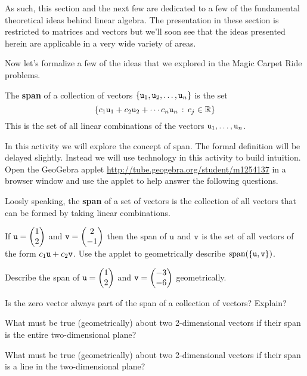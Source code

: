 As such, this section and the next few are dedicated to a few of the fundamental theoretical ideas behind
linear algebra.  The presentation in these section is restricted to matrices and vectors
but we'll soon see that the ideas presented herein are applicable in a very wide variety
of areas.  

Now let's formalize a few of the ideas that we explored in the Magic Carpet Ride problems.
\begin{definition}
    The {\bf span} of a collection of vectors $\{\texttt{u}_1,\texttt{u}_2,\ldots,\texttt{u}_n\}$ is the set \[
    \{ c_1 \texttt{u}_1 + c_2 \texttt{u}_2 + \cdots c_n \texttt{u}_n \, : \, c_j \in \mathbb{R} \} \] This is
    the set of all linear combinations of the vectors $\texttt{u}_1, \ldots, \texttt{u}_n$.
\end{definition}

% 
\begin{problem}
    In this activity we will explore the concept of span.  The formal
    definition will be delayed slightly. Instead we will use technology in this
    activity to build intuition. Open the GeoGebra applet
    \href{http://tube.geogebra.org/student/m1254137}{http://tube.geogebra.org/student/m1254137}
    in a browser window and use the applet to help answer the following questions.

    Loosly speaking, the {\bf span} of a set of vectors is the collection of all vectors that can
    be formed by taking linear combinations.  
    \ba
        \item If $\texttt{u} = \begin{pmatrix} 1 \\ 2\end{pmatrix}$ and $\texttt{v} = \begin{pmatrix} 2 \\ -1 \end{pmatrix}$ then the span of
            $\texttt{u}$ and $\texttt{v}$ is the set of all vectors of the form $c_1 \texttt{u} + c_2
            \texttt{v}$. Use the applet to geometrically describe $\text{span}(\{\texttt{u},\texttt{v}\})$.
        \item Describe the span of $\texttt{u} = \begin{pmatrix} 1 \\ 2 \end{pmatrix}$ and $\texttt{v} = \begin{pmatrix} -3 \\ -6 \end{pmatrix}$
            geometrically.
        \item Is the zero vector always part of the span of a collection of vectors?
            Explain?
        \item What must be true (geometrically) about two 2-dimensional vectors if their
            span is the entire two-dimensional plane?  
        \item What must be true (geometrically) about two 2-dimensional vectors if their
            span is a line in the two-dimensional plane?  
    \ea
\end{problem}

